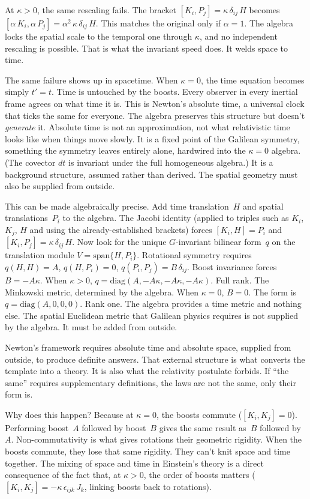 \documentclass[11pt]{article}
\begin{document}
At $\kappa > 0$, the same rescaling fails. The bracket $[K_i, P_j] = \kappa\,\delta_{ij}\,H$ becomes $[\alpha\,K_i, \alpha\,P_j] = \alpha^2\,\kappa\,\delta_{ij}\,H$. This matches the original only if $\alpha = 1$. The algebra locks the spatial scale to the temporal one through $\kappa$, and no independent rescaling is possible. That is what the invariant speed does. It welds space to time.

The same failure shows up in spacetime. When $\kappa = 0$, the time equation becomes simply $t' = t$. Time is untouched by the boosts. Every observer in every inertial frame agrees on what time it is. This is Newton's absolute time, a universal clock that ticks the same for everyone. The algebra preserves this structure but doesn't \emph{generate} it. Absolute time is not an approximation, not what relativistic time looks like when things move slowly. It is a fixed point of the Galilean symmetry, something the symmetry leaves entirely alone, hardwired into the $\kappa = 0$ algebra. (The covector $dt$ is invariant under the full homogeneous algebra.) It is a background structure, assumed rather than derived. The spatial geometry must also be supplied from outside.

This can be made algebraically precise. Add time translation~$H$ and spatial translations~$P_i$ to the algebra. The Jacobi identity (applied to triples such as $K_i$, $K_j$, $H$ and using the already-established brackets) forces $[K_i, H] = P_i$ and $[K_i, P_j] = \kappa\,\delta_{ij}\,H$. Now look for the unique $G$-invariant bilinear form~$q$ on the translation module $V = \mathrm{span}\{H, P_i\}$. Rotational symmetry requires $q(H,H) = A$, $q(H, P_i) = 0$, $q(P_i, P_j) = B\,\delta_{ij}$. Boost invariance forces $B = -A\kappa$. When $\kappa > 0$, $q = \mathrm{diag}(A, -A\kappa, -A\kappa, -A\kappa)$. Full rank. The Minkowski metric, determined by the algebra. When $\kappa = 0$, $B = 0$. The form is $q = \mathrm{diag}(A, 0, 0, 0)$. Rank one. The algebra provides a time metric and nothing else. The spatial Euclidean metric that Galilean physics requires is not supplied by the algebra. It must be added from outside.

Newton's framework requires absolute time and absolute space, supplied from outside, to produce definite answers. That external structure is what converts the template into a theory. It is also what the relativity postulate forbids. If ``the same'' requires supplementary definitions, the laws are not the same, only their form is.

Why does this happen? Because at $\kappa = 0$, the boosts commute ($[K_i, K_j] = 0$). Performing boost~$A$ followed by boost~$B$ gives the same result as~$B$ followed by~$A$. Non-commutativity is what gives rotations their geometric rigidity. When the boosts commute, they lose that same rigidity. They can't knit space and time together. The mixing of space and time in Einstein's theory is a direct consequence of the fact that, at $\kappa > 0$, the order of boosts matters ($[K_i, K_j] = -\kappa\,\epsilon_{ijk}\,J_k$, linking boosts back to rotations).
\end{document}
